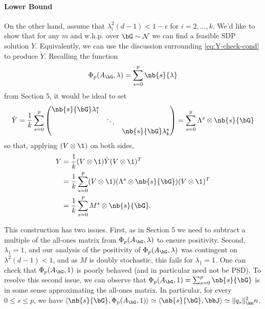 \paragraph{Lower Bound}
On the other hand, assume that $\lambda_i^2(d-1) < 1 - \epsilon$ for $i=2,...,k$. We'd like to show that for any $m$ and w.h.p. over $\bG \sim \mathcal{N}$ we can find a feasible SDP solution $Y$. Equivalently, we can use the discussion surrounding \eqref{eq:Y-check-cond} to produce $\check Y$. Recalling the function 
$$
    \Phi_p(A_{\bG},\lambda) = \sum_{s=0}^p \nb{s}{\lambda} 
$$
from Section 5, it would be ideal to set
$$
    \check Y = \frac{1}{k}\sum_{s = 0}^p \begin{pmatrix} \nb{s}{\bG}\lambda_1^s & & \\ & \ddots & \\ & & \nb{s}{\bG}\lambda_k^s \end{pmatrix} = \sum_{s = 0}^p \Lambda^s \otimes \nb{s}{\bG}
$$
so that, applying $(V \otimes \1)$ on both sides,
\begin{align*}
    Y 
    &= \frac{1}{k}(V\otimes \1) \check Y (V \otimes \1)^T \\
    &=\frac{1}{k}\sum_{s = 0}^p (V\otimes \1) (\Lambda^s \otimes \nb{s}{\bG})(V \otimes \1)^T \\
    &= \frac{1}{k}\sum_{s=0}^p M^s \otimes \nb{s}{\bG}.
\end{align*}

This construction has two issues. First, as in Section 5 we need to subtract a multiple of the all-ones matrix from $\Phi_p(A_{\bG},\lambda)$ to ensure positivity. Second, $\lambda_1 = 1$, and our analysis of the positivity of $\Phi_p(A_{\bG},\lambda)$ was contingent on $\lambda^2(d-1) < 1$, and as $M$ is doubly stochastic, this fails for $\lambda_1 = 1$. One can check that $\Phi_p(A_{\bG},1)$ is poorly behaved (and in particular need not be PSD). To resolve this second issue, we can observe that $\Phi_p(A_{\bG},1) = \sum_{s=0}^p \nb{s}{\bG}$ is in some sense approximating the all-ones matrix. In particular, for every $0 \le s \le p$, we have $\langle \nb{s}{\bG},\Phi_p(A_{\bG},1) \rangle \simeq \langle \nb{s}{\bG},\bbJ \rangle \simeq \|q_s\|^2_{\km}n$.

